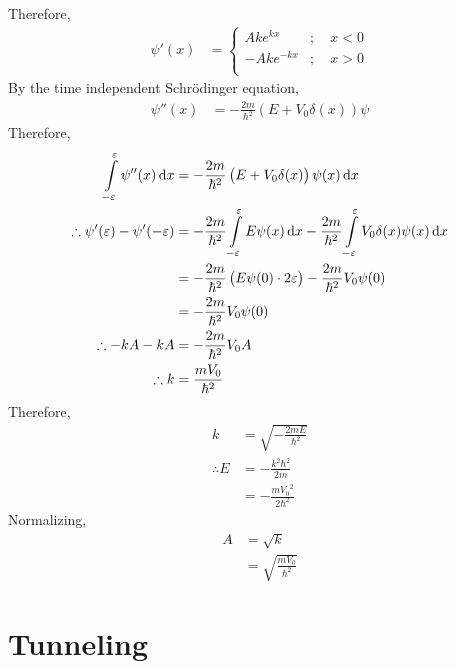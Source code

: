 \documentclass[titlepage, fleqn, a4paper, 12pt, twoside]{article}
\theoremstyle{definition}
\theoremstyle{theorem}
\let\Oldsection\section
\renewcommand{\section}{\FloatBarrier\Oldsection}
\begin{document}
Therefore,
\begin{align*}
	\psi'(x) &=
		\begin{cases}
			A k e^{k x} &;\quad x < 0\\
			-A k e^{-k x} &;\quad x > 0\\
		\end{cases}
\end{align*}
By the time independent Schrödinger equation,
\begin{align*}
	\psi''(x) &= -\frac{2 m}{\hbar^2} \left( E + V_0 \delta(x) \right) \psi
\end{align*}
Therefore,
\begin{align*}
	\int\limits_{-\varepsilon}^{\varepsilon} \psi''(x) \dif x &= -\frac{2 m}{\hbar^2} \left( E + V_0 \delta(x) \right) \psi(x) \dif x\\
	\therefore \psi'(\varepsilon) - \psi'(-\varepsilon) &= -\frac{2 m}{\hbar^2} \int\limits_{-\varepsilon}^{\varepsilon} E \psi(x) \dif x - \frac{2 m}{\hbar^2} \int\limits_{-\varepsilon}^{\varepsilon} V_0 \delta(x) \psi(x) \dif x\\
	&= -\frac{2 m}{\hbar^2} \left( E \psi(0) \cdot 2 \varepsilon \right) - \frac{2 m}{\hbar^2} V_0 \psi(0)\\
	&= -\frac{2 m}{\hbar^2} V_0 \psi(0)\\
	\therefore -k A - k A &= -\frac{2 m}{\hbar^2} V_0 A\\
	\therefore k &= \frac{m V_0}{\hbar^2}
\end{align*}
Therefore,
\begin{align*}
	k &= \sqrt{-\frac{2 m E}{\hbar^2}}\\
	\therefore E &= -\frac{k^2 \hbar^2}{2 m}\\
	&= -\frac{m {V_0}^2}{2 \hbar^2}
\end{align*}
Normalizing,
\begin{align*}
	A &= \sqrt{k}\\
	&= \sqrt{\frac{m V_0}{\hbar^2}}
\end{align*}

\section{Tunneling}
\end{document}
